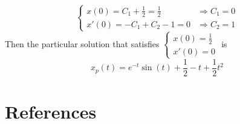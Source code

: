 \documentclass[twoside]{article}
\begin{document}
\begin{example}
    \begin{equation}
    \begin{cases}
        x(0) = C_1 + \frac{1}{2} = \frac{1}{2} &\Longrightarrow C_1 = 0\\
        x'(0) = -C_1 + C_2 -1 =0 &\Longrightarrow C_2 = 1
    \end{cases}
    \end{equation}
    Then the particular solution that satisfies $\begin{cases}
        x(0) = \frac{1}{2}\\
        x'(0) = 0
    \end{cases}$ is \begin{equation}
        x_p(t) = e^{-t}\sin(t) + \frac{1}{2} - t + \frac{1}{2} t^2
    \end{equation}


\end{example}










































\clearpage
\section*{References}

\end{document}

